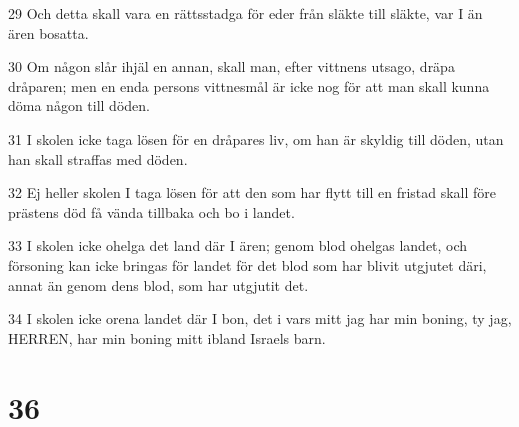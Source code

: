 \par 29 Och detta skall vara en rättsstadga för eder från släkte till släkte, var I än ären bosatta.
\par 30 Om någon slår ihjäl en annan, skall man, efter vittnens utsago, dräpa dråparen; men en enda persons vittnesmål är icke nog för att man skall kunna döma någon till döden.
\par 31 I skolen icke taga lösen för en dråpares liv, om han är skyldig till döden, utan han skall straffas med döden.
\par 32 Ej heller skolen I taga lösen för att den som har flytt till en fristad skall före prästens död få vända tillbaka och bo i landet.
\par 33 I skolen icke ohelga det land där I ären; genom blod ohelgas landet, och försoning kan icke bringas för landet för det blod som har blivit utgjutet däri, annat än genom dens blod, som har utgjutit det.
\par 34 I skolen icke orena landet där I bon, det i vars mitt jag har min boning, ty jag, HERREN, har min boning mitt ibland Israels barn.

\chapter{36}

